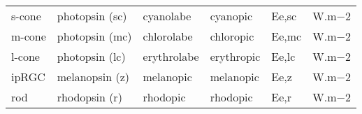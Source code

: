 \documentclass[letterpaper,10pt,english]{sphinxmanual}
\begin{document}
\begin{savenotes}\sphinxattablestart
\centering
\begin{tabulary}{\linewidth}[t]{|T|T|T|T|T|T|}
\hline
{}\relax &\relax &\relax &\relax &\relax &\relax \\
\hline
s-cone
&
photopsin (sc)
&
cyanolabe
&
cyanopic
&
Ee,sc
&
W.m−2
\\
\hline
m-cone
&
photopsin (mc)
&
chlorolabe
&
chloropic
&
Ee,mc
&
W.m−2
\\
\hline
l-cone
&
photopsin (lc)
&
erythrolabe
&
erythropic
&
Ee,lc
&
W.m−2
\\
\hline
ipRGC
&
melanopsin (z)
&
melanopic
&
melanopic
&
Ee,z
&
W.m−2
\\
\hline
rod
&
rhodopsin (r)
&
rhodopic
&
rhodopic
&
Ee,r
&
W.m−2
\\
\hline
\end{tabulary}
\par
\sphinxattableend\end{savenotes}
\end{document}

